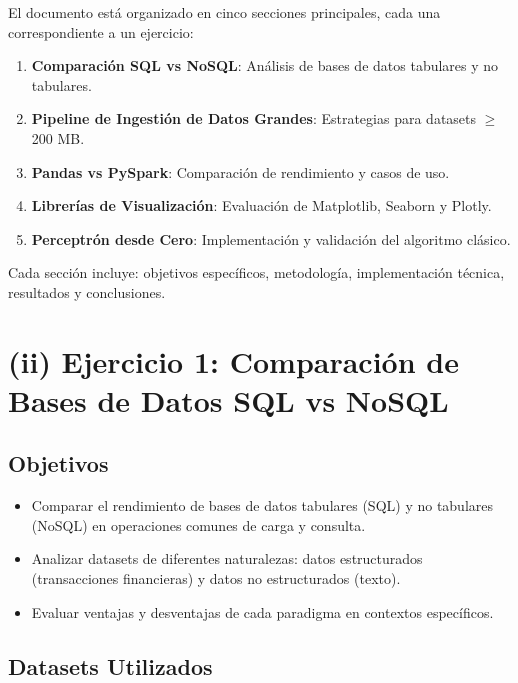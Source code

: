 \documentclass[12pt]{src/formato_utem}
\begin{document}
El documento está organizado en cinco secciones principales, cada una correspondiente a un ejercicio:

\begin{enumerate}
    \item \textbf{Comparación SQL vs NoSQL}: Análisis de bases de datos tabulares y no tabulares.
    \item \textbf{Pipeline de Ingestión de Datos Grandes}: Estrategias para datasets $\geq$ 200 MB.
    \item \textbf{Pandas vs PySpark}: Comparación de rendimiento y casos de uso.
    \item \textbf{Librerías de Visualización}: Evaluación de Matplotlib, Seaborn y Plotly.
    \item \textbf{Perceptrón desde Cero}: Implementación y validación del algoritmo clásico.
\end{enumerate}

Cada sección incluye: objetivos específicos, metodología, implementación técnica, resultados y conclusiones.

\newpage

\section*{(ii) Ejercicio 1: Comparación de Bases de Datos SQL vs NoSQL}

\subsection*{Objetivos}

\begin{itemize}
    \item Comparar el rendimiento de bases de datos tabulares (SQL) y no tabulares (NoSQL) en operaciones comunes de carga y consulta.
    \item Analizar datasets de diferentes naturalezas: datos estructurados (transacciones financieras) y datos no estructurados (texto).
    \item Evaluar ventajas y desventajas de cada paradigma en contextos específicos.
\end{itemize}

\subsection*{Datasets Utilizados}
\end{document}
